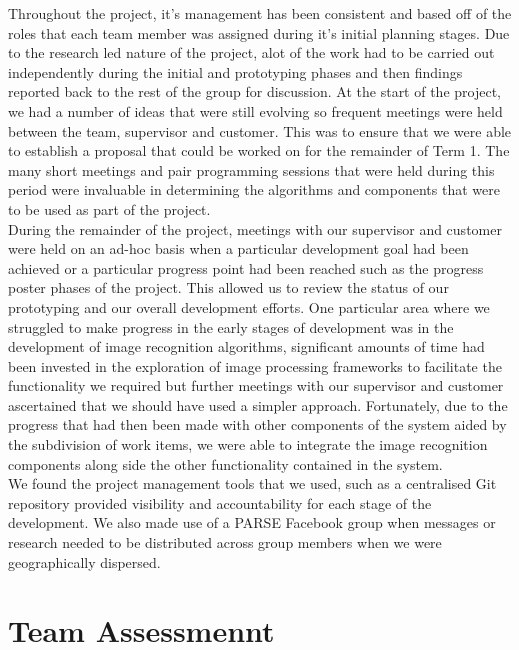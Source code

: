 Throughout the project, it's management has been consistent and based off of the roles that each team member was assigned during it's initial planning stages. Due to the research led nature of the project, alot of the work had to be carried out independently during the initial and prototyping phases and then findings reported back to the rest of the group for discussion. At the start of the project, we had a number of ideas that were still evolving so frequent meetings were held between the team, supervisor and customer. This was to ensure that we were able to establish a proposal that could be worked on for the remainder of Term 1. The many short meetings and pair programming sessions that were held during this period were invaluable in determining the algorithms and components that were to be used as part of the project. \\

During the remainder of the project, meetings with our supervisor and customer were held on an ad-hoc basis when a particular development goal had been achieved or a particular progress point had been reached such as the progress poster phases of the project. This allowed us to review the status of our prototyping and our overall development efforts. One particular area where we struggled to make progress in the early stages of development was in the development of image recognition algorithms, significant amounts of time had been invested in the exploration of image processing frameworks to facilitate the functionality we required but further meetings with our supervisor and customer ascertained that we should have used a simpler approach. Fortunately, due to the progress that had then been made with other components of the system aided by the subdivision of work items, we were able to integrate the image recognition components along side the other functionality contained in the system. \\

We found the project management tools that we used, such as a centralised Git repository provided visibility and accountability for each stage of the development. We also made use of a PARSE Facebook group when messages or research needed to be distributed across group members when we were geographically dispersed. \\

\section{Team Assessmennt}

